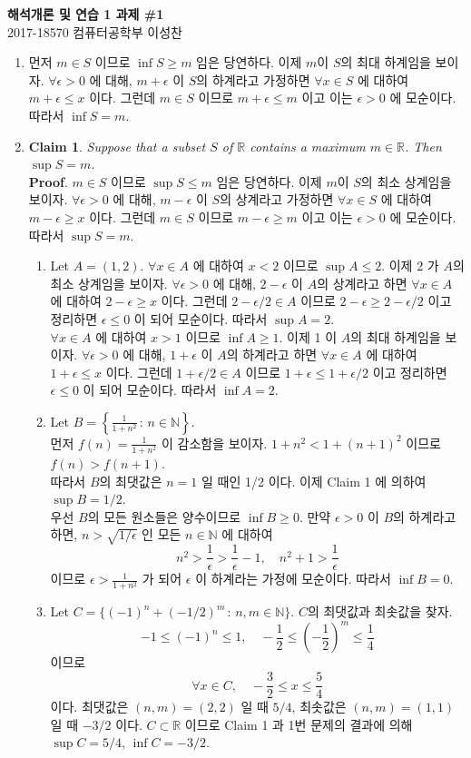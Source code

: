 \documentclass[12pt]{report}
\newcommand{\numl}[1]{\item[\large\textbf{\sffamily #1.}]}
\newcommand{\num}[1]{\item[\textbf{\sffamily #1}]}
\newcommand{\bb}[1]{\mathbb{#1}}
\begin{document}
\begin{center}
\textbf{\Large 해석개론 및 연습 1 과제 \#1}\\
\large 2017-18570 컴퓨터공학부 이성찬
\end{center}
\begin{enumerate}
\numl{1} 먼저 $ m\in S $ 이므로 $ \inf{S}\geq m $ 임은 당연하다. 이제 $ m $이 $S$의 최대 하계임을 보이자. $\forall \epsilon >0$ 에 대해, $m+\epsilon$ 이 $S$의 하계라고 가정하면 $\forall x\in S$ 에 대하여 $m+\epsilon \leq x$ 이다. 그런데 $m\in S$ 이므로 $m+\epsilon \leq m$ 이고 이는 $\epsilon > 0$ 에 모순이다. 따라서 $\inf S = m$.
	
\numl{2} \textbf{Claim 1}. \textit{Suppose that a subset $S$ of $\bb{R}$ contains a maximum $m\in \bb{R}$. Then $\sup S = m$.}\\
\textbf{Proof}. $m\in S$ 이므로 $\sup S \leq m$ 임은 당연하다. 이제 $m$이 $S$의 최소 상계임을 보이자. $\forall \epsilon >0$ 에 대해, $m - \epsilon$ 이 $S$의 상계라고 가정하면 $\forall x\in S$ 에 대하여 $m-\epsilon \geq x$ 이다. 그런데 $m\in S$ 이므로 $m-\epsilon \geq m$ 이고 이는 $\epsilon >0$ 에 모순이다. 따라서 $\sup S = m$.
\begin{enumerate}
	\num{(1)} Let $ A = (1, 2) $. $\forall x\in A$ 에 대하여 $x<2$ 이므로 $\sup A \leq 2$. 이제 2 가 $A$의 최소 상계임을 보이자. $\forall \epsilon > 0$ 에 대해, $2-\epsilon$ 이 $A$의 상계라고 하면 $\forall x \in A$ 에 대하여 $2-\epsilon \geq x$ 이다. 그런데 $2 - \epsilon / 2 \in A$ 이므로 $2-\epsilon \geq 2 - \epsilon /2$ 이고 정리하면 $\epsilon \leq 0$ 이 되어 모순이다. 따라서 $\sup A = 2$.\\
	$\forall x\in A$ 에 대하여 $x> 1$ 이므로 $\inf A \geq 1$. 이제 1 이 $A$의 최대 하계임을 보이자. $\forall \epsilon > 0$ 에 대해, $1+\epsilon$ 이 $A$의 하계라고 하면 $\forall x \in A$ 에 대하여 $1+\epsilon \leq x$ 이다. 그런데 $1+\epsilon / 2 \in A$ 이므로 $1+\epsilon \leq 1+ \epsilon /2$ 이고 정리하면 $\epsilon \leq 0$ 이 되어 모순이다. 따라서 $\inf A = 2$.
	\num{(2)} Let $ B = \left\{\frac{1}{1 + n^2}\,:\,n\in\bb{N}\right\} $. \\
	먼저 $f(n) = \frac{1}{1+n^2}$ 이 감소함을 보이자. $1 + n^2 < 1+ (n+1)^2$ 이므로 $f(n) > f(n+1)$.\\
	따라서 $B$의 최댓값은 $n=1$ 일 때인 1/2 이다. 이제 Claim 1 에 의하여 $\sup B = 1/2$.\\
	우선 $B$의 모든 원소들은 양수이므로 $\inf B\geq 0$. 만약 $\epsilon > 0$ 이 $B$의 하계라고 하면, $n > \sqrt{1/\epsilon} $ 인 모든 $n\in \bb{N}$ 에 대하여 $$n^2 > \frac{1}{\epsilon} > \frac{1}{\epsilon} - 1,\quad n^2+1>\frac{1}{\epsilon}$$ 이므로 $\epsilon > \frac{1}{1 + n^2}$ 가 되어 $\epsilon$ 이 하계라는 가정에 모순이다. 따라서 $\inf B = 0$.
	\num{(3)} Let $C = \{(-1)^n + (-1/2)^m\,:\,n, m\in \bb{N}\}$. $C$의 최댓값과 최솟값을 찾자. $$-1\leq (-1)^n\leq 1, \quad -\frac{1}{2}\leq \left(-\frac{1}{2}\right)^m \leq \frac{1}{4}$$ 이므로 $$\forall x \in C, \quad -\frac{3}{2} \leq x \leq \frac{5}{4}$$ 이다. 최댓값은 $(n, m) = (2, 2)$ 일 때 $5/4$, 최솟값은 $(n, m) = (1, 1)$ 일 때 $-3/2$ 이다. $C\subset \bb{R}$ 이므로 Claim 1 과 1번 문제의 결과에 의해 $\sup C = 5/4$, $\inf C = -3/2$. 
\end{enumerate}


\end{enumerate}
\end{document}
